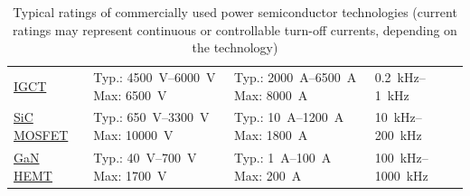 \begin{frame}
\begin{table}
\begin{tabular}{p{2.5cm} p{3.6cm} p{3.5cm} p{2.8cm}}
			\href{https://en.wikipedia.org/wiki/Integrated_gate-commutated_thyristor}{IGCT} &
			Typ.: \SIrange{4500}{6000}{\volt}
			\newline Max: \SI{6500}{\volt}                                                  &
			Typ.: \SIrange{2000}{6500}{\ampere}
			\newline Max: \SI{8000}{\ampere}                                                &
			\SIrange{0.2}{1}{\kilo\hertz}                                                                                                       \\

			\href{https://en.wikipedia.org/wiki/Silicon_carbide}{SiC MOSFET}                &
			Typ.: \SIrange{650}{3300}{\volt}
			\newline Max: \SI{10000}{\volt}                                                 &
			Typ.: \SIrange{10}{1200}{\ampere}
			\newline Max: \SI{1800}{\ampere}                                                &
			\SIrange{10}{200}{\kilo\hertz}                                                                                                      \\

			\href{https://en.wikipedia.org/wiki/Gallium_nitride}{GaN HEMT}                  &
			Typ.: \SIrange{40}{700}{\volt}
			\newline Max: \SI{1700}{\volt}                                                  &
			Typ.: \SIrange{1}{100}{\ampere}
			\newline Max: \SI{200}{\ampere}                                                 &
			\SIrange{100}{1000}{\kilo\hertz}                                                                                                    \\

			\bottomrule
		\end{tabular}
		\caption{Typical ratings of commercially used power semiconductor technologies (current ratings may represent continuous or controllable turn-off currents, depending on the technology)}
	\end{table}
\end{frame}

